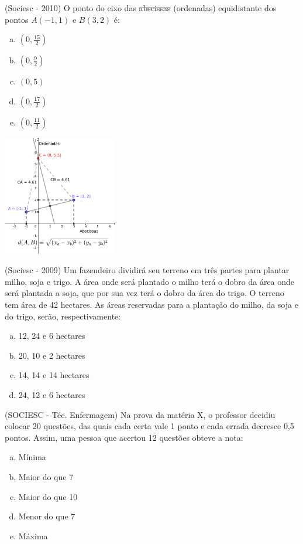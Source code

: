  \begin{exer}
 (Sociesc - 2010) O ponto do eixo das \sout{abscissas} (ordenadas) equidistante dos pontos $A(-1, 1)$ e $B(3, 2)$ é:

 \begin{multicols}{2}
 \begin{enumerate}[a)]
  \item $(0, \frac{15}{2})$
  \item $(0, \frac{9}{2})$
  \item $(0,5)$
  \item $(0, \frac{17}{2})$
  \item $(0, \frac{11}{2})$
 \end{enumerate}

 \includegraphics[width=5cm]{./Capitulos/Figuras/dist_exer1.pdf}

 \end{multicols}
 \end{exer}

 \begin{exer}
 (Sociesc - 2009) Um fazendeiro dividirá seu terreno em três partes para plantar milho, soja e trigo. A área onde será plantado o milho terá o dobro da área onde será plantada a soja, que por sua vez terá o dobro da área do trigo. O terreno tem área de 42 hectares. As áreas reservadas para a plantação do milho, da soja e do trigo, serão, respectivamente:
  \begin{enumerate}[a)]
  \item 12, 24 e 6 hectares
  \item 20, 10 e 2 hectares
  \item 14, 14 e 14 hectares
  \item 24, 12 e 6 hectares
 \end{enumerate}
 \end{exer}

 \begin{exer}
  (SOCIESC - Téc. Enfermagem) Na prova da matéria X, o professor decidiu colocar 20 questões, das quais cada certa vale 1 ponto e cada errada decresce 0,5 pontos. Assim, uma pessoa que acertou 12 questões obteve a nota:
  \begin{enumerate}[a)]
  \item Mínima
  \item Maior do que 7
  \item Maior do que 10
  \item Menor do que 7
  \item Máxima
 \end{enumerate}
 \end{exer}

